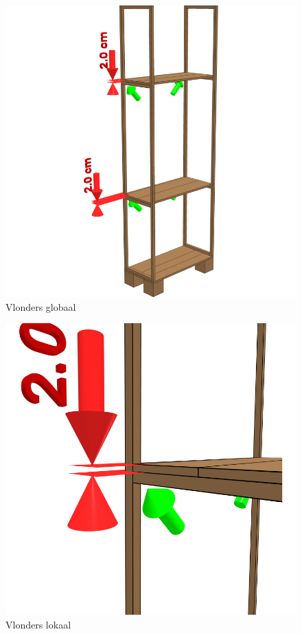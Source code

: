 \documentclass{article}
\begin{document}
\begin{figure}[h!]
    \centering
    \includegraphics[width=\textwidth]{scene 6 - vlonders a.png}
    \caption{Vlonders globaal}
\end{figure}

\begin{figure}[h!]
    \centering
    \includegraphics[width=\textwidth]{scene 6 - vlonders b.png}
    \caption{Vlonders lokaal}
\end{figure}
\end{document}
